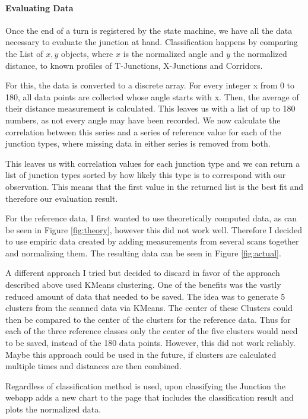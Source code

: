 
\paragraph{Evaluating Data}
Once the end of a turn is registered by the state machine, we have all the data necessary to evaluate the junction at hand.
Classification happens by comparing the List of ${x,y}$ objects, where $x$ is the normalized angle and $y$ the normalized distance, to known profiles of T-Junctions, X-Junctions and Corridors.

For this, the data is converted to a discrete array. For every integer x from 0 to 180, all data points are collected whose angle starts with x. Then, the average of their distance measurement is calculated. This leaves us with a list of up to 180 numbers, as not every angle may have been recorded. We now calculate the correlation between this series and a series of reference value for each of the junction types, where missing data in either series is removed from both.

This leaves us with correlation values for each junction type and we can return a list of junction types sorted by how likely this type is to correspond with our observation. This means that the first value in the returned list is the best fit and therefore our evaluation result.

For the reference data, I first wanted to use theoretically computed data, as can be seen in Figure \ref{fig:theory}, however this did not work well.
Therefore I decided to use empiric data created by adding measurements from several scans together and normalizing them. The resulting data can be seen in Figure \ref{fig:actual}.

A different approach I tried but decided to discard in favor of the approach described above used KMeans clustering.
One of the benefits was the vastly reduced amount of data that needed to be saved.
The idea was to generate 5 clusters from the scanned data via KMeans. The center of these Clusters could then be compared to the center of the clusters for the reference data.
Thus for each of the three reference classes only the center of the five clusters would need to be saved, instead of the 180 data points.
However, this did not work reliably.
Maybe this approach could be used in the future, if clusters are calculated multiple times and distances are then combined.

Regardless of classification method is used, upon classifying the Junction the webapp adds a new chart to the page that includes the classification result and plots the normalized data.

